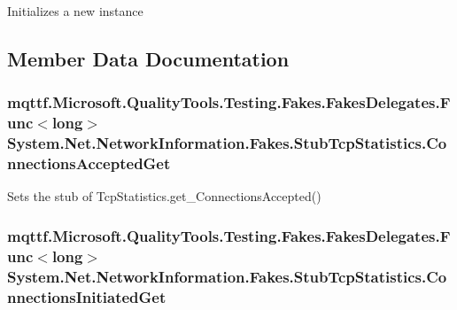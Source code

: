 Initializes a new instance



\subsection{Member Data Documentation}
\hypertarget{class_system_1_1_net_1_1_network_information_1_1_fakes_1_1_stub_tcp_statistics_a81819c4813559169b633782ce5c95bed}{
\subsubsection[{Connections\-Accepted\-Get}]{\setlength{\rightskip}{0pt plus 5cm}mqttf.\-Microsoft.\-Quality\-Tools.\-Testing.\-Fakes.\-Fakes\-Delegates.\-Func$<$long$>$ System.\-Net.\-Network\-Information.\-Fakes.\-Stub\-Tcp\-Statistics.\-Connections\-Accepted\-Get}}\label{class_system_1_1_net_1_1_network_information_1_1_fakes_1_1_stub_tcp_statistics_a81819c4813559169b633782ce5c95bed}


Sets the stub of Tcp\-Statistics.\-get\-\_\-\-Connections\-Accepted()

\hypertarget{class_system_1_1_net_1_1_network_information_1_1_fakes_1_1_stub_tcp_statistics_acca95bf724d16f02fbad51c0e6cd882b}{
\subsubsection[{Connections\-Initiated\-Get}]{\setlength{\rightskip}{0pt plus 5cm}mqttf.\-Microsoft.\-Quality\-Tools.\-Testing.\-Fakes.\-Fakes\-Delegates.\-Func$<$long$>$ System.\-Net.\-Network\-Information.\-Fakes.\-Stub\-Tcp\-Statistics.\-Connections\-Initiated\-Get}}\label{class_system_1_1_net_1_1_network_information_1_1_fakes_1_1_stub_tcp_statistics_acca95bf724d16f02fbad51c0e6cd882b}


